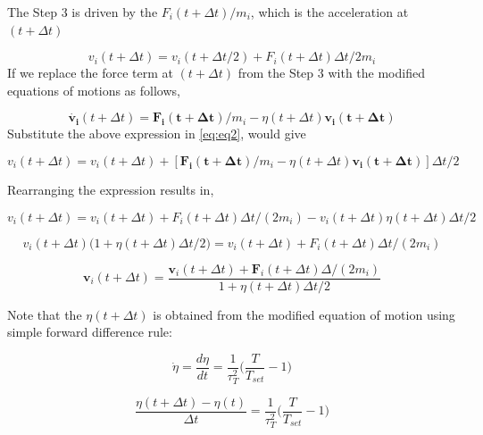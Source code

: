 \documentclass{article}
\begin{document}
The Step 3 is driven by the $F_{i}(t+\Delta t)/m_{i}$, which is the acceleration at $(t+\Delta t)$

\begin{equation}
  v_{i}(t+\Delta t) = v_{i}(t+\Delta t/2) + F_{i}(t+\Delta t) \Delta t/2m_{i}
  \label{eq:eq2}
\end{equation}
If we replace the force term at $(t+\Delta t)$ from the Step 3 with the modified equations of motions as follows,

\begin{equation}
\dot{\mathbf{v_{i}}}(t+\Delta t) = \mathbf{F_{i}(t+\Delta t)}/m_{i} - \eta(t+\Delta t) \mathbf{v_{i}(t+\Delta t)}
\end{equation}
Substitute the above expression in \ref{eq:eq2}, would give

\begin{equation}
  v_{i}(t+\Delta t) = v_{i}(t+\Delta t) + [\mathbf{F_{i}(t+\Delta t)}/m_{i} - \eta(t+\Delta t) \mathbf{v_{i}(t+\Delta t)}] \Delta t/2
  \label{eq:eq3}
\end{equation}

Rearranging the expression results in,

\begin{equation}
  v_{i}(t+\Delta t) = v_{i}(t+\Delta t) + F_{i}(t+\Delta t) \Delta t/(2m_{i}) - v_{i}(t+\Delta t) \eta(t+\Delta t)\Delta t/2
\end{equation}

\begin{equation}
  v_{i}(t+\Delta t)\Big(1 + \eta(t+\Delta t)\Delta t/2 \Big) = v_{i}(t+\Delta t) + F_{i}(t+\Delta t) \Delta t/(2m_{i})
\end{equation}

\begin{equation}
\boxed{ \mathbf{v}_{i}(t+\Delta t) = \frac{\mathbf{v}_{i}(t+\Delta t) + \mathbf{F}_{i}(t+\Delta t) \Delta/(2m_{i})}{1 + \eta(t+\Delta t)\Delta t/2} } 
\end{equation}

Note that the $\eta(t+\Delta t)$ is obtained from the modified equation of motion using simple forward difference rule:

\begin{equation}
\dot{\eta} = \frac{d\eta}{dt} = \frac{1}{\tau^2_{T}} \Big(\frac{T}{T_{set}} - 1\Big)
\end{equation}

\begin{equation}
\frac{\eta(t+\Delta t) - \eta(t)}{\Delta t} = \frac{1}{\tau^2_{T}} \Big(\frac{T}{T_{set}} - 1\Big) 
\end{equation}
\end{document}

